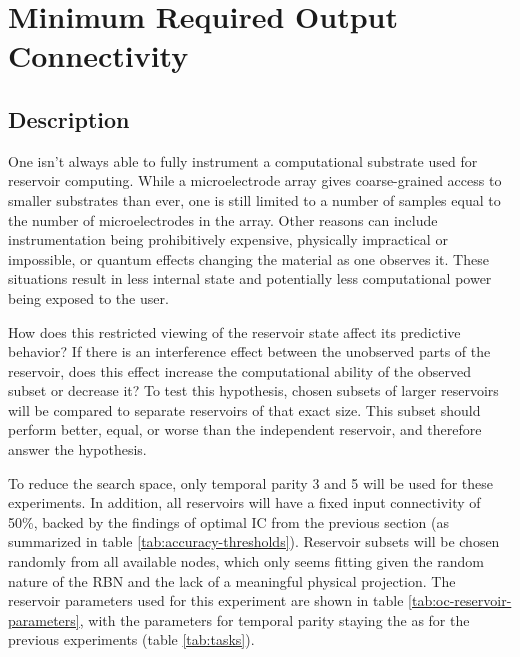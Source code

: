 \section{Minimum Required Output Connectivity}

\subsection{Description}

One isn't always able to fully instrument a computational substrate used for reservoir computing.
While a microelectrode array gives coarse-grained access to smaller substrates than ever,
one is still limited to a number of samples equal to the number of microelectrodes in the array.
Other reasons can include instrumentation being prohibitively expensive,
physically impractical or impossible,
or quantum effects changing the material as one observes it.
These situations result in less internal state and potentially less computational power being exposed to the user.

How does this restricted viewing of the reservoir state affect its predictive behavior?
If there is an interference effect between the unobserved parts of the reservoir,
does this effect increase the computational ability of the observed subset or decrease it?
To test this hypothesis,
chosen subsets of larger reservoirs will be compared to separate reservoirs of that exact size.
This subset should perform better, equal, or worse than the independent reservoir, and therefore answer the hypothesis.

To reduce the search space, only temporal parity 3 and 5 will be used for these experiments.
In addition, all reservoirs will have a fixed input connectivity of 50\%,
backed by the findings of optimal IC from the previous section (as summarized in table \ref{tab:accuracy-thresholds}).
Reservoir subsets will be chosen randomly from all available nodes,
which only seems fitting given the random nature of the RBN and the lack of a meaningful physical projection.
The reservoir parameters used for this experiment are shown in table \ref{tab:oc-reservoir-parameters},
with the parameters for temporal parity staying the as for the previous experiments (table \ref{tab:tasks}).

